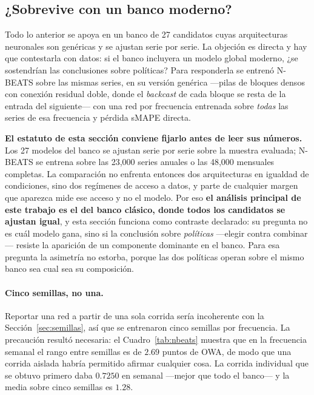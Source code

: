 \subsection{¿Sobrevive con un banco moderno?}\label{sec:nbeats}

Todo lo anterior se apoya en un banco de 27 candidatos cuyas arquitecturas neuronales son
genéricas y se ajustan serie por serie. La objeción es directa y hay que contestarla con
datos: si el banco incluyera un modelo global moderno, ¿se sostendrían las conclusiones
sobre políticas? Para responderla se entrenó N-BEATS \cite{oreshkin2020} sobre las mismas
series, en su versión genérica ---pilas de bloques densos con conexión residual doble,
donde el \emph{backcast} de cada bloque se resta de la entrada del siguiente--- con una
red por frecuencia entrenada sobre \emph{todas} las series de esa frecuencia y pérdida
sMAPE directa.

\textbf{El estatuto de esta sección conviene fijarlo antes de leer sus números.} Los 27
modelos del banco se ajustan serie por serie sobre la muestra evaluada; N-BEATS se
entrena sobre las 23{,}000 series anuales o las 48{,}000 mensuales completas. La
comparación no enfrenta entonces dos arquitecturas en igualdad de condiciones, sino dos
regímenes de acceso a datos, y parte de cualquier margen que aparezca mide ese acceso y
no el modelo. Por eso \textbf{el análisis principal de este trabajo es el del banco
clásico, donde todos los candidatos se ajustan igual}, y esta sección funciona como
contraste declarado: su pregunta no es cuál modelo gana, sino si la conclusión sobre
\emph{políticas} ---elegir contra combinar--- resiste la aparición de un componente
dominante en el banco. Para esa pregunta la asimetría no estorba, porque las dos
políticas operan sobre el mismo banco sea cual sea su composición.

\paragraph{Cinco semillas, no una.} Reportar una red a partir de una sola corrida sería
incoherente con la Sección~\ref{sec:semillas}, así que se entrenaron cinco semillas por
frecuencia. La precaución resultó necesaria: el Cuadro~\ref{tab:nbeats} muestra que en
la frecuencia semanal el rango entre semillas es de $2.69$ puntos de OWA, de modo que
una corrida aislada habría permitido afirmar cualquier cosa. La corrida individual que
se obtuvo primero daba $0.7250$ en semanal ---mejor que todo el banco--- y la media
sobre cinco semillas es $1.28$.

